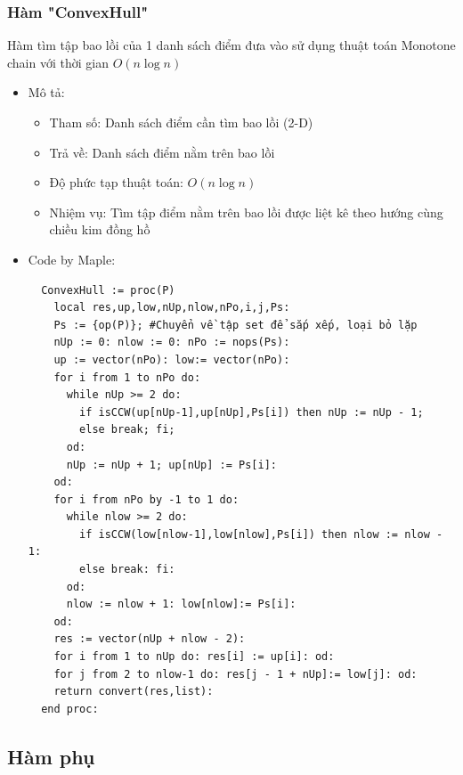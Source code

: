 \documentclass[12pt]{article}
\begin{document}
      \subsubsection{Hàm "ConvexHull"}
        Hàm tìm tập bao lồi của 1 danh sách điểm đưa vào sử dụng thuật toán Monotone chain với thời gian $O(n \log n)$
        \begin{itemize}
          \item Mô tả:
          \begin{itemize}
            \item Tham số: Danh sách điểm cần tìm bao lồi (2-D)
            \item Trả về: Danh sách điểm nằm trên bao lồi 
            \item Độ phức tạp thuật toán: $O(n\log n)$
            \item Nhiệm vụ: Tìm tập điểm nằm trên bao lồi được liệt kê theo hướng cùng chiều kim đồng hồ
          \end{itemize}
        \item Code by Maple:
        \begin{verbatim}
  ConvexHull := proc(P)
    local res,up,low,nUp,nlow,nPo,i,j,Ps:
    Ps := {op(P)}; #Chuyển về tập set để sắp xếp, loại bỏ lặp
    nUp := 0: nlow := 0: nPo := nops(Ps):
    up := vector(nPo): low:= vector(nPo):
    for i from 1 to nPo do:
      while nUp >= 2 do:
        if isCCW(up[nUp-1],up[nUp],Ps[i]) then nUp := nUp - 1;
        else break; fi;
      od:
      nUp := nUp + 1; up[nUp] := Ps[i]:
    od:
    for i from nPo by -1 to 1 do:
      while nlow >= 2 do:
        if isCCW(low[nlow-1],low[nlow],Ps[i]) then nlow := nlow - 1:
        else break: fi:
      od:
      nlow := nlow + 1: low[nlow]:= Ps[i]:
    od:
    res := vector(nUp + nlow - 2):
    for i from 1 to nUp do: res[i] := up[i]: od:
    for j from 2 to nlow-1 do: res[j - 1 + nUp]:= low[j]: od:
    return convert(res,list):
  end proc:
        \end{verbatim}
      \end{itemize}
        \newpage
    \subsection{Hàm phụ}
\end{document}
